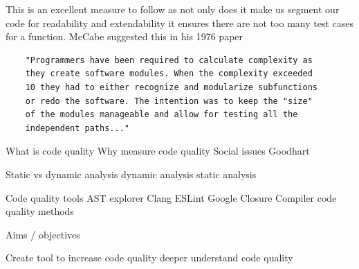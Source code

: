 This is an excellent measure to follow as not only does it make us segment our code for readability and extendability it ensures there are not too many test cases for a function.
\newline
McCabe suggested this in his 1976 paper \cite{cycloMaticComplexity}
\begin{verbatim}
    "Programmers have been required to calculate complexity as 
    they create software modules. When the complexity exceeded 
    10 they had to either recognize and modularize subfunctions 
    or redo the software. The intention was to keep the "size" 
    of the modules manageable and allow for testing all the 
    independent paths..."
\end{verbatim}

What is code quality
Why measure code quality
Social issues
    Goodhart


Static vs dynamic analysis
    dynamic analysis   
    static analysis

Code quality tools
    AST explorer
    Clang
    ESLint
    Google Closure Compiler
code quality methods


Aims / objectives

    Create tool to increase code quality
    deeper understand code quality





